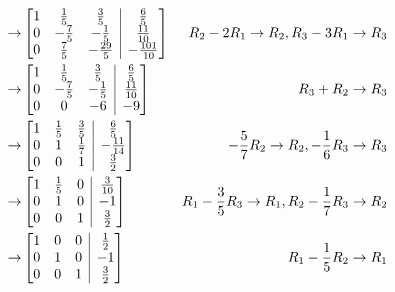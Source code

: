 \begin{Answer}
\begin{align*}
\to &
\left[
\begin{array}{@{}ccc|c@{}}
1 & \frac{1}{5} & \frac{3}{5} & \frac{6}{5}\\
0 & -\frac{7}{5} & -\frac{1}{5} & \frac{11}{10}\\
0 & \frac{7}{5} & -\frac{29}{5} & -\frac{101}{10}
\end{array}
\right] & R_2 - 2R_1 \to R_2, R_3 - 3R_1 \to R_3
\\
\to &
\left[
\begin{array}{@{}ccc|c@{}}
1 & \frac{1}{5} & \frac{3}{5} & \frac{6}{5}\\
0 & -\frac{7}{5} & -\frac{1}{5} & \frac{11}{10}\\
0 & 0 & -6 & -9
\end{array}
\right] & R_3 + R_2 \to R_3
\\
\to &
\left[
\begin{array}{@{}ccc|c@{}}
1 & \frac{1}{5} & \frac{3}{5} & \frac{6}{5}\\
0 & 1 & \frac{1}{7} & -\frac{11}{14}\\
0 & 0 & 1 & \frac{3}{2}
\end{array}
\right] & -\frac{5}{7}R_2 \to R_2, -\frac{1}{6}R_3 \to R_3
\\
\to &
\left[
\begin{array}{@{}ccc|c@{}}
1 & \frac{1}{5} & 0 & \frac{3}{10}\\
0 & 1 & 0 & -1\\
0 & 0 & 1 & \frac{3}{2}
\end{array}
\right] & R_1 - \frac{3}{5}R_3 \to R_1, R_2 - \frac{1}{7}R_3 \to R_2
\\
\to &
\left[
\begin{array}{@{}ccc|c@{}}
1 & 0 & 0 & \frac{1}{2}\\
0 & 1 & 0 & -1\\
0 & 0 & 1 & \frac{3}{2}
\end{array}
\right] & R_1 - \frac{1}{5}R_2 \rightarrow R_1
\end{align*}
\end{Answer}

